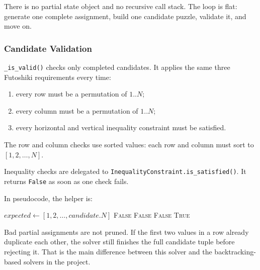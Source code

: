 There is no partial state object and no recursive call stack. The loop is flat:
generate one complete assignment, build one candidate puzzle, validate it, and
move on.

\subsubsection{Candidate Validation}

\texttt{\_is\_valid()} checks only completed candidates. It applies the same
three Futoshiki requirements every time:

\begin{enumerate}
  \item every row must be a permutation of $1..N$;
  \item every column must be a permutation of $1..N$;
  \item every horizontal and vertical inequality constraint must be satisfied.
\end{enumerate}

The row and column checks use sorted values:
each row and column must sort to \([1,2,\ldots,N]\).

Inequality checks are delegated to \texttt{InequalityConstraint.is\_satisfied()}.
It returns \texttt{False} as soon as one check fails.

In pseudocode, the helper is:

\begin{algorithm}[h]
  \caption{\textsc{IsValid}}
  \label{alg:brute_force_is_valid}
  \begin{algorithmic}[1]
      \State $expected \gets [1,2,\ldots,candidate.N]$
          \State \Return \textsc{False}
        \EndIf
      \EndFor
          \State \Return \textsc{False}
        \EndIf
      \EndFor
          \State \Return \textsc{False}
        \EndIf
      \EndFor
      \State \Return \textsc{True}
    \EndProcedure
  \end{algorithmic}
\end{algorithm}

Bad partial assignments are not pruned. If the first two values in a row
already duplicate each other, the solver still finishes the full candidate
tuple before rejecting it. That is the main difference between this solver and
the backtracking-based solvers in the project.

